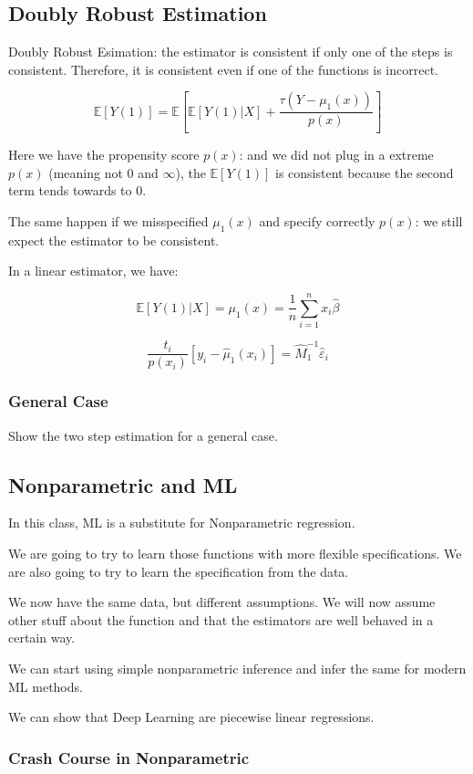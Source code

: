 \documentclass{article}
\begin{document}
\subsection{Doubly Robust Estimation}

Doubly Robust Esimation: the estimator is consistent if only one of the steps is consistent. Therefore, it is consistent even if one of the functions is incorrect.

$$
\mathbb{E}[Y(1)] =
\mathbb{E}\left[\mathbb{E}[Y(1) | X] + \frac{\tau (Y - \mu_1(x))}{p(x)}\right]
$$

Here we have the propensity score $p(x)$: and we did not plug in a extreme $p(x)$ (meaning not 0 and $\infty$), the $\mathbb{E}[Y(1)]$ is consistent because the second term tends towards to 0.

The same happen if we misspecified $\mu_1(x)$ and specify correctly $p(x)$: we still expect the estimator to be consistent.

In a linear estimator, we have:

$$
\mathbb{E}[Y(1) | X] = \mu_1(x) = \frac{1}{n} \sum_{i=1}^n x_i \hat{\beta}
$$

$$
\frac{t_i}{p(x_i)} \left[ y_i - \hat{\mu}_1 (x_i) \right] = \hat{M}_1^{-1} \hat{\varepsilon}_i
$$

\subsubsection{General Case}
Show the two step estimation for a general case.

\subsection{Nonparametric and ML}
In this class, ML is a substitute for Nonparametric regression.

We are going to try to learn those functions with more flexible specifications. We are also going to try to learn the specification from the data.

We now have the same data, but different assumptions. We will now assume other stuff about the function and that the estimators are well behaved in a certain way.

We can start using simple nonparametric inference and infer the same for modern ML methods.

We can show that Deep Learning are piecewise linear regressions.

\subsubsection{Crash Course in Nonparametric}
\end{document}
